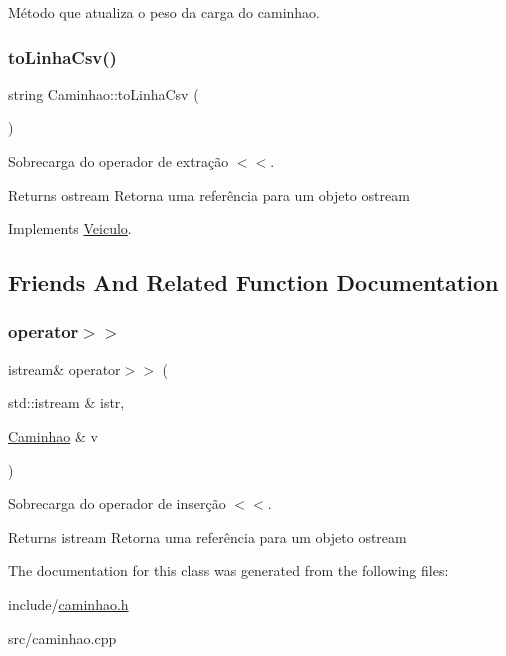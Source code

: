Método que atualiza o peso da carga do caminhao. \mbox{\label{classCaminhao_aabcf701d339872da35d7a2948b474ec3}} 
\subsubsection{\texorpdfstring{to\+Linha\+Csv()}{toLinhaCsv()}}
{\footnotesize\ttfamily string Caminhao\+::to\+Linha\+Csv (\begin{DoxyParamCaption}{ }\end{DoxyParamCaption})\hspace{0.3cm}{\ttfamily [virtual]}}

Sobrecarga do operador de extração $<$$<$. \begin{DoxyReturn}{Returns}
ostream Retorna uma referência para um objeto ostream 
\end{DoxyReturn}


Implements \hyperlink{classVeiculo}{Veiculo}.



\subsection{Friends And Related Function Documentation}
\mbox{\label{classCaminhao_a8b4c2cf9aa77fc48a4c2b68bd052b512}} 
\subsubsection{\texorpdfstring{operator$>$$>$}{operator>>}}
{\footnotesize\ttfamily istream\& operator$>$$>$ (\begin{DoxyParamCaption}\item[{std\+::istream \&}]{istr,  }\item[{\hyperlink{classCaminhao}{Caminhao} \&}]{v }\end{DoxyParamCaption})\hspace{0.3cm}{\ttfamily [friend]}}

Sobrecarga do operador de inserção $<$$<$. \begin{DoxyReturn}{Returns}
istream Retorna uma referência para um objeto ostream 
\end{DoxyReturn}


The documentation for this class was generated from the following files\+:\begin{DoxyCompactItemize}
\item 
include/\hyperlink{caminhao_8h}{caminhao.\+h}\item 
src/caminhao.\+cpp\end{DoxyCompactItemize}
